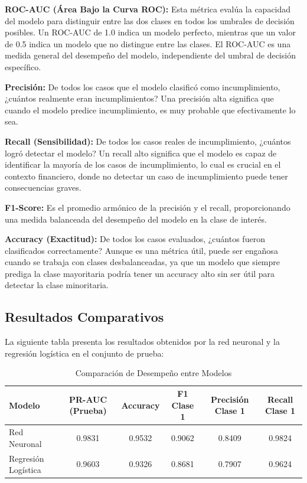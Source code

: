 \documentclass[12pt,a4paper]{article}
\begin{document}
\textbf{ROC-AUC (Área Bajo la Curva ROC):} Esta métrica evalúa la capacidad del modelo para distinguir entre las dos clases en todos los umbrales de decisión posibles. Un ROC-AUC de 1.0 indica un modelo perfecto, mientras que un valor de 0.5 indica un modelo que no distingue entre las clases. El ROC-AUC es una medida general del desempeño del modelo, independiente del umbral de decisión específico.

\textbf{Precisión:} De todos los casos que el modelo clasificó como incumplimiento, ¿cuántos realmente eran incumplimientos? Una precisión alta significa que cuando el modelo predice incumplimiento, es muy probable que efectivamente lo sea.

\textbf{Recall (Sensibilidad):} De todos los casos reales de incumplimiento, ¿cuántos logró detectar el modelo? Un recall alto significa que el modelo es capaz de identificar la mayoría de los casos de incumplimiento, lo cual es crucial en el contexto financiero, donde no detectar un caso de incumplimiento puede tener consecuencias graves.

\textbf{F1-Score:} Es el promedio armónico de la precisión y el recall, proporcionando una medida balanceada del desempeño del modelo en la clase de interés.

\textbf{Accuracy (Exactitud):} De todos los casos evaluados, ¿cuántos fueron clasificados correctamente? Aunque es una métrica útil, puede ser engañosa cuando se trabaja con clases desbalanceadas, ya que un modelo que siempre prediga la clase mayoritaria podría tener un accuracy alto sin ser útil para detectar la clase minoritaria.

\subsection{Resultados Comparativos}

La siguiente tabla presenta los resultados obtenidos por la red neuronal y la regresión logística en el conjunto de prueba:

\begin{table}[htbp]
    \centering
    \caption{Comparación de Desempeño entre Modelos}
    \label{tab:resultados}
    \small
    \begin{tabular}{lccccc}
        \toprule
        Modelo & PR-AUC (Prueba) & Accuracy & F1 Clase 1 & Precisión Clase 1 & Recall Clase 1 \\
        \midrule
        Red Neuronal        & 0.9831 & 0.9532 & 0.9062 & 0.8409 & 0.9824 \\
        Regresión Logística & 0.9603 & 0.9326 & 0.8681 & 0.7907 & 0.9624 \\
        \bottomrule
    \end{tabular}
\end{table}
\end{document}
